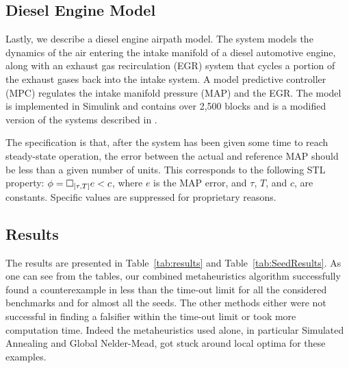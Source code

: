




\subsection{Diesel Engine Model} \label{sec:diesel} 

Lastly, we describe a diesel engine airpath model.
The system models the dynamics of the air entering the intake manifold of a diesel automotive engine, along with an exhaust gas recirculation (EGR) system that cycles a portion of the exhaust gases back into the intake system. A model predictive controller (MPC) regulates the intake manifold pressure (MAP) and the EGR. The model is implemented in Simulink\textsuperscript{\textregistered} and contains over 2,500 blocks and is a modified version of the systems described in \cite{jin-tcad15}.

The specification is that, after the system has been given some time to reach steady-state operation, the error between the actual and reference MAP should be less than a given number of units.
This corresponds to the following STL property: $\phi=\Box_{[\tau,T]}e<c$, where $e$ is the MAP error, and $\tau$, $T$, and $c$, are constants. Specific values are suppressed for proprietary reasons.

\subsection{Results} 
The results are presented in Table~\ref{tab:results} and Table~\ref{tab:SeedResults}.  
As one can see from the tables, our combined metaheuristics algorithm successfully found a counterexample in
less than the time-out limit for all the considered benchmarks and for almost all the seeds. 
The other methods either were not successful in finding a falsifier within the time-out limit or 
took more computation time. Indeed the metaheuristics used alone, in particular Simulated Annealing 
and Global Nelder-Mead, got stuck around local optima for these examples.


